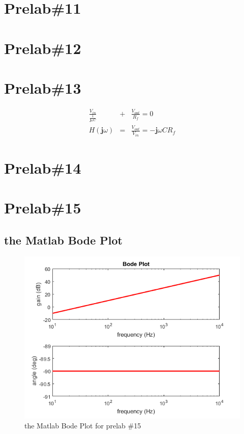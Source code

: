 \documentclass{IEEEtran}
\begin{document}
	\section{\textbf{Prelab\#11}}
	\section{\textbf{Prelab\#12}}
	\section{\textbf{Prelab\#13}}
	\begin{eqnarray*}
		\frac{V_{in}}{\frac{1}{\mathbf{j}\omega C}} & + & \frac{V_{out}}{R_f}  =  0\\
		H(\mathbf{j}\omega) & = & \frac{V_{out}}{V_{in}}  =  -\mathbf{j}\omega CR_f
	\end{eqnarray*}
	\section{\textbf{Prelab\#14}}
	\section{\textbf{Prelab\#15}}
	\subsection{the Matlab Bode Plot}
	\begin{figure}[!htbp]
		\centering
		\begin{framed}
			\includegraphics[width=\linewidth]{images/15.png}
			\caption{the Matlab Bode Plot for prelab \#15}
			\label{fig:1501}
		\end{framed}
	\end{figure}
\end{document}
